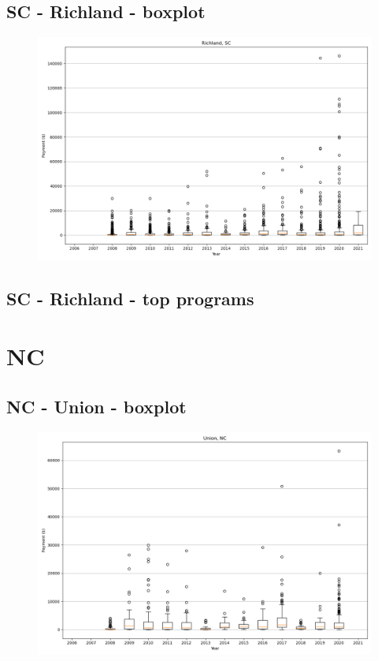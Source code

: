 \subsection*{SC - Richland - boxplot}
\begin{figure}[h]
\centering
\includegraphics[width=7in]{../output/boxplots/counties/Richland-SC_boxplot.png}
\end{figure}


\subsection*{SC - Richland - top programs}

\newpage
\section*{NC}
\subsection*{NC - Union - boxplot}
\begin{figure}[h]
\centering
\includegraphics[width=7in]{../output/boxplots/counties/Union-NC_boxplot.png}
\end{figure}


